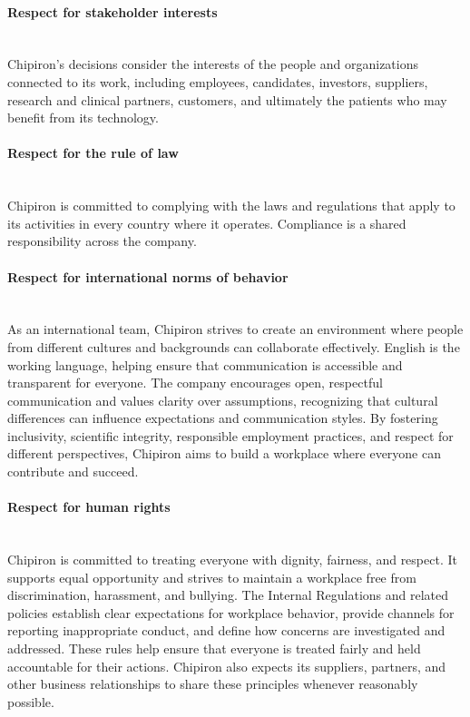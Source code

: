 \documentclass[12pt]{article}
\begin{document}
\paragraph{Respect for stakeholder interests}
\mbox{}\\
Chipiron's decisions consider the interests of the people and organizations connected to its work, including employees, candidates, investors, suppliers, research and clinical partners, customers, and ultimately the patients who may benefit from its technology.

\paragraph{Respect for the rule of law}
\mbox{}\\
Chipiron is committed to complying with the laws and regulations that apply to its activities in every country where it operates.
Compliance is a shared responsibility across the company.

\paragraph{Respect for international norms of behavior}
\mbox{}\\
As an international team, Chipiron strives to create an environment where people from different cultures and backgrounds can collaborate effectively.
English is the working language, helping ensure that communication is accessible and transparent for everyone.
The company encourages open, respectful communication and values clarity over assumptions, recognizing that cultural differences can influence expectations and communication styles.
By fostering inclusivity, scientific integrity, responsible employment practices, and respect for different perspectives, Chipiron aims to build a workplace where everyone can contribute and succeed.

\paragraph{Respect for human rights}
\mbox{}\\
Chipiron is committed to treating everyone with dignity, fairness, and respect. It supports equal opportunity and strives to maintain a workplace free from discrimination, harassment, and bullying.
The Internal Regulations and related policies establish clear expectations for workplace behavior, provide channels for reporting inappropriate conduct, and define how concerns are investigated and addressed.
These rules help ensure that everyone is treated fairly and held accountable for their actions.
Chipiron also expects its suppliers, partners, and other business relationships to share these principles whenever reasonably possible.
\newpage
\end{document}
